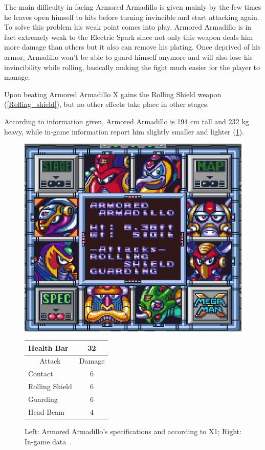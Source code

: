 The main difficulty in facing Armored Armadillo is given mainly by the few times he leaves open himself to hits before turning invincible and start attacking again. To solve this problem his weak point comes into play. Armored Armadillo is in fact extremely weak to the Electric Spark since not only this weapon deals him more damage than others but it also can remove his plating. Once deprived of his armor, Armadillo won't be able to guard himself anymore and will also lose his invincibility while rolling, basically making the fight much easier for the player to manage.

Upon beating Armored Armadillo X gains the Rolling Shield weapon (\ref{Rolling_shield}), but no other effects take place in other stages.

According to information given, Armored Armadillo is 194 cm tall and 232 kg heavy, while in-game information report him slightly smaller and lighter (\ref{Armadillo_specs}).
\begin{figure}[htp]
	\begin{minipage}[c]{0.45\linewidth}
		\vspace{0pt}
		\centering
		\includegraphics[width=\linewidth]{figures/X1/Armored_armadillo/Armored_armadillo_specs.png}
	\end{minipage}
	\begin{minipage}[c]{0.45\linewidth}
		\centering
		\vspace{0pt}
		\begin{tabular}[h]{l c}
			\toprule
			Health Bar & 32\\
			\midrule
			\multicolumn{1}{c}{Attack} & \multicolumn{1}{c}{Damage}\\
			Contact & 6\\
			Rolling Shield& 6\\
			Guarding & 6\\
			Head Beam & 4\\
			\bottomrule
		\end{tabular}
	\end{minipage}
	\caption{Left: Armored Armadillo's specifications and according to X1; Right: In-game data~\cite{wiki:Armored_Armadillo}. }
	\label{Armadillo_specs}
\end{figure}


